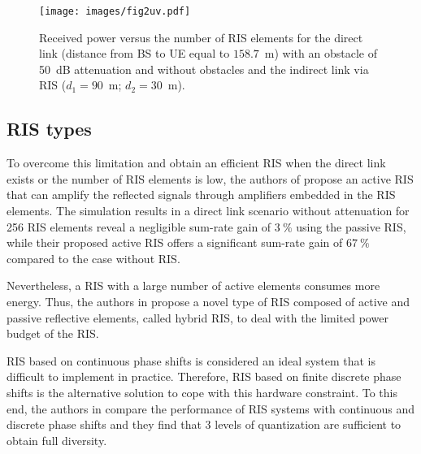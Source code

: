 \documentclass[conference]{IEEEtran}
\begin{document}
\begin{figure}
	\centering
	\texttt{[image: images/fig2uv.pdf]}
	\caption{Received power versus the number of RIS elements for the direct link (distance from BS to UE equal to $158.7$~m) with an obstacle of  50~dB attenuation  and without obstacles and the indirect link via RIS ($d_1= 90$~m; $d_2 = 30$~m). }  
   \label{direct_indirect_Pr }
   \vspace{-0.35cm}
\end{figure}

\subsection{RIS types}
 To overcome this limitation and obtain an efficient RIS when the direct link exists or the number of RIS elements is low, the authors of \cite{9998527} propose an active RIS that can amplify the reflected signals through amplifiers embedded in the RIS elements.  The simulation results in a direct link scenario without attenuation for 256 RIS elements   reveal  a negligible sum-rate gain 
of $3~\%$ using the passive RIS, while their proposed active RIS offers a significant sum-rate gain   of $67~\%$ compared to the case without RIS.

 
 
Nevertheless, a RIS with a large number of active elements consumes more energy. Thus, the authors in \cite{9833956}  propose a novel type of RIS composed of active and passive reflective elements, called hybrid RIS, to deal with the limited power budget of the RIS.

RIS based on continuous phase shifts is considered an ideal system that is difficult to implement in practice. Therefore, RIS based on finite discrete phase shifts is the alternative solution to cope with this hardware constraint. To this end, the authors in \cite{9223720} compare the performance of RIS systems with continuous and discrete phase shifts and they find that 3 levels of quantization are sufficient to obtain full diversity.
\end{document}
